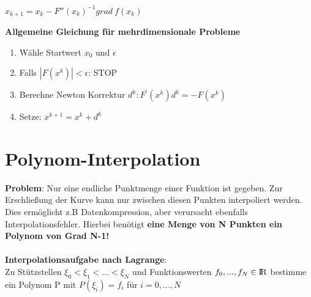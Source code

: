 \documentclass[10pt,a4paper]{article}
\def\realnumbers{{\rm I\!R}}
\begin{document}
	\begin{center}
		$x_{k + 1} = x_k - F''(x_k)^{-1} grad\ f(x_k)$
        \end{center}
        \textbf{Allgemeine Gleichung für mehrdimensionale Probleme}
        \begin{enumerate}
        	\item Wähle Startwert $x_0$ und $\epsilon$
        	\item Falls $|F(x^k)| < \epsilon$: STOP
        	\item Berechne Newton Korrektur $d^k: F^{\prime}(x^k)d^k = -F(x^k)$
        	\item Setze: $x^{k+1} = x^{k} + d^{k}$
        \end{enumerate}

        \section{Polynom-Interpolation}
	\textbf{Problem}: Nur eine endliche Punktmenge einer Funktion ist gegeben. Zur Erschließung der Kurve kann nur zwischen diesen Punkten interpoliert werden. Dies ermöglicht z.B Datenkompression, aber verursacht ebenfalls Interpolationsfehler. Hierbei benötigt \textbf{eine Menge von N Punkten ein Polynom von Grad N-1!}\\\\
	\textbf{Interpolationsaufgabe nach Lagrange}:\\
	Zu Stützstellen $\xi_0 < \xi_1 < ... < \xi_N$ und Funktionswerten $f_0, ..., f_N \in \realnumbers$ bestimme ein Polynom P mit $P(\xi_i) = f_i$ für $i = 0, ..., N$
	
\end{document}
